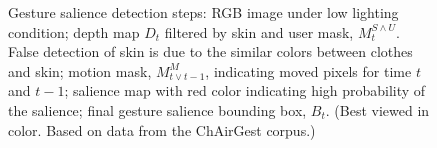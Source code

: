 \begin{figure}[tbh]
\centering
\hspace{-0.6em}%
\caption{Gesture salience detection steps:  RGB image under low lighting condition;
 depth map $D_t$ filtered by skin and user mask, $M_t^{S\wedge U}$. False detection of skin is due to
the similar colors between clothes and skin;  motion mask,  $M_{t\vee t-1}^M$, indicating moved pixels for time $t$ and $t-1$;
 salience map with red color indicating high probability of the salience;
 final gesture salience bounding box, $B_t$. (Best viewed in
color. Based on data from the ChAirGest corpus.)}
\label{fig:gesture-salience}
\end{figure}

